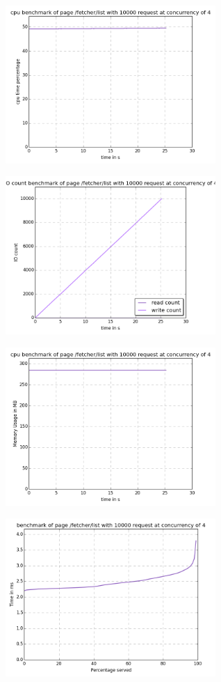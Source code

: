 \begin{center}
\includegraphics[width=0.6\textwidth]{img/fetcher.list.cpu.png}



\includegraphics[width=0.6\textwidth]{img/fetcher.list.io-count.png}



\includegraphics[width=0.6\textwidth]{img/fetcher.list.mem.png}



\includegraphics[width=0.6\textwidth]{img/fetcher.list.serv-time.png}




\end{center}
